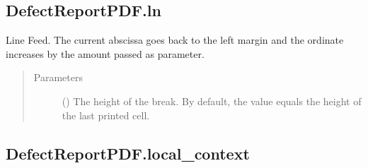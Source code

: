 \documentclass[letterpaper,10pt,english]{sphinxmanual}
\begin{document}
\begin{fulllineitems}
\begin{fulllineitems}
\begin{quote}
\begin{description}
\begin{itemize}
\end{itemize}

\end{description}\end{quote}

\end{fulllineitems}



\subsection{DefectReportPDF.ln}
\label{\detokenize{generated/quality_assessment.quality_pdf_report.DefectReportPDF.ln:defectreportpdf-ln}}\label{\detokenize{generated/quality_assessment.quality_pdf_report.DefectReportPDF.ln::doc}}

\begin{fulllineitems}
\label{\detokenize{generated/quality_assessment.quality_pdf_report.DefectReportPDF.ln:quality_assessment.quality_pdf_report.DefectReportPDF.ln}}
\sphinxAtStartPar
Line Feed.
The current abscissa goes back to the left margin and the ordinate increases by
the amount passed as parameter.
\begin{quote}\begin{description}
\item[{Parameters}] \leavevmode
\sphinxAtStartPar
{} () \textendash{} The height of the break.
By default, the value equals the height of the last printed cell.

\end{description}\end{quote}

\end{fulllineitems}



\subsection{DefectReportPDF.local\_context}
\label{\detokenize{generated/quality_assessment.quality_pdf_report.DefectReportPDF.local_context:defectreportpdf-local-context}}\label{\detokenize{generated/quality_assessment.quality_pdf_report.DefectReportPDF.local_context::doc}}


\end{fulllineitems}
\end{document}
